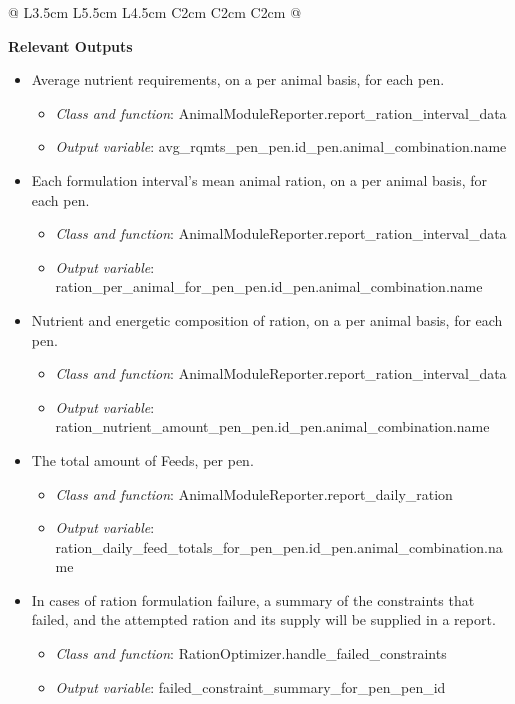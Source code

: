 \begin{refsection}
\begin{landscape}
\begin{table}[h!]
\begin{tabular}{@{} L{3.5cm} L{5.5cm} L{4.5cm} C{2cm} C{2cm} C{2cm} @{}}
\bottomrule

\end{tabular}
\end{table}

\end{landscape}





\textbf{Relevant Outputs}
\begin{itemize}
    \item Average nutrient requirements, on a per animal basis, for each pen.
    \begin{itemize}
        \item \textit{Class and function}: AnimalModuleReporter.report\_ration\_interval\_data
        \item \textit{Output variable}: avg\_rqmts\_pen\_{pen.id}\_{pen.animal\_combination.name}
    \end{itemize}
    \item Each formulation interval’s mean animal ration, on a per animal basis, for each pen.
    \begin{itemize}
        \item \textit{Class and function}: AnimalModuleReporter.report\_ration\_interval\_data
        \item \textit{Output variable}: ration\_per\_animal\_for\_pen\_{pen.id}\_{pen.animal\_combination.name}
    \end{itemize}
    \item Nutrient and energetic composition of ration, on a per animal basis, for each pen.
    \begin{itemize}
        \item \textit{Class and function}: AnimalModuleReporter.report\_ration\_interval\_data
        \item \textit{Output variable}: ration\_nutrient\_amount\_pen\_{pen.id}\_{pen.animal\_combination.name}
    \end{itemize}
    \item The total amount of Feeds, per pen.
    \begin{itemize}
        \item \textit{Class and function}: AnimalModuleReporter.report\_daily\_ration
        \item \textit{Output variable}: ration\_daily\_feed\_totals\_for\_pen\_{pen.id}\_{pen.animal\_combination.name}
    \end{itemize}
    \item In cases of ration formulation failure, a summary of the constraints that failed, and the attempted ration and its supply will be supplied in a report.
    \begin{itemize}
        \item \textit{Class and function}: RationOptimizer.handle\_failed\_constraints
        \item \textit{Output variable}: failed\_constraint\_summary\_for\_pen\_{pen\_id}
    \end{itemize}	
\end{itemize}


\end{refsection}
